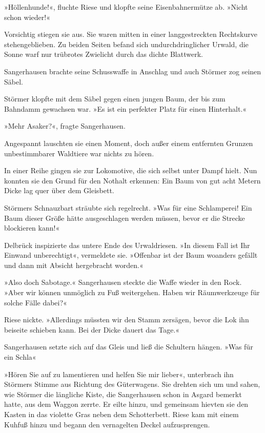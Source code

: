 »Höllenhunde!«, fluchte Riese und klopfte seine Eisenbahnermütze
ab. »Nicht schon wieder!«

Vorsichtig stiegen sie aus. Sie waren mitten in einer
langgestreckten Rechtskurve stehengeblieben. Zu beiden Seiten
befand sich undurchdringlicher Urwald, die Sonne warf nur trübrotes
Zwielicht durch das dichte Blattwerk.

Sangerhausen brachte seine Schusswaffe in Anschlag und auch Störmer
zog seinen Säbel.

Störmer klopfte mit dem Säbel gegen einen jungen Baum, der bis zum
Bahndamm gewachsen war. »Es ist ein perfekter Platz für einen
Hinterhalt.«

»Mehr Asaker?«, fragte Sangerhausen.

Angespannt lauschten sie einen Moment, doch außer einem entfernten
Grunzen unbestimmbarer Waldtiere war nichts zu hören.

In einer Reihe gingen sie zur Lokomotive, die sich selbst unter
Dampf hielt. Nun konnten sie den Grund für den Nothalt erkennen:
Ein Baum von gut acht Metern Dicke lag quer über dem Gleisbett.

Störmers Schnauzbart sträubte sich regelrecht. »Was für eine
Schlamperei! Ein Baum dieser Größe hätte ausgeschlagen werden
müssen, bevor er die Strecke blockieren kann!«

Delbrück inspizierte das untere Ende des Urwaldriesen. »In diesem
Fall ist Ihr Einwand unberechtigt«, vermeldete sie. »Offenbar ist
der Baum woanders gefällt und dann mit Absicht hergebracht
worden.«

»Also doch Sabotage.« Sangerhausen steckte die Waffe wieder in den
Rock. »Aber wir können unmöglich zu Fuß weitergehen. Haben wir
Räumwerkzeuge für solche Fälle dabei?«

Riese nickte. »Allerdings müssten wir den Stamm zersägen, bevor die
Lok ihn beiseite schieben kann. Bei der Dicke dauert das Tage.«

Sangerhausen setzte sich auf das Gleis und ließ die Schultern
hängen. »Was für ein Schla\dash{}«

»Hören Sie auf zu lamentieren und helfen Sie mir lieber«,
unterbrach ihn Störmers Stimme aus Richtung des Güterwagens. Sie
drehten sich um und sahen, wie Störmer die längliche Kiste, die
Sangerhausen schon in Asgard bemerkt hatte, aus dem Waggon zerrte.
Er eilte hinzu, und gemeinsam hievten sie den Kasten in das
violette Gras neben dem Schotterbett. Riese kam mit einem Kuhfuß
hinzu und begann den vernagelten Deckel aufzusprengen.

